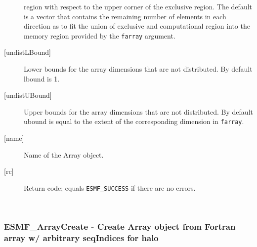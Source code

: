 \begin{description}
   region with respect to the upper corner of the exclusive region. 
   The default is a vector that contains the remaining number of elements 
   in each direction as to fit the union of exclusive and computational 
   region into the memory region provided by the {\tt farray} argument. 
   \item[{[undistLBound]}] 
   Lower bounds for the array dimensions that are not distributed. 
   By default lbound is 1. 
   \item[{[undistUBound]}] 
   Upper bounds for the array dimensions that are not distributed. 
   By default ubound is equal to the extent of the corresponding 
   dimension in {\tt farray}. 
   \item[{[name]}] 
   Name of the Array object. 
   \item[{[rc]}] 
   Return code; equals {\tt ESMF\_SUCCESS} if there are no errors. 
   \end{description} 
    
 
\mbox{}\hrulefill\ 
 
\subsubsection [ESMF\_ArrayCreate] {ESMF\_ArrayCreate - Create Array object from Fortran array w/ arbitrary seqIndices for halo}


